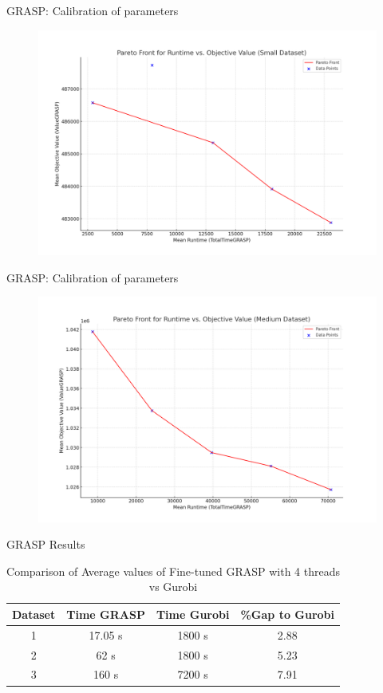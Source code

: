 \documentclass{beamer}
\begin{document}
\begin{frame}{GRASP: Calibration of parameters}
\begin{figure}
        \centering
        \includegraphics[scale=0.3]{pareto_front_small.png}
    \end{figure}
\end{frame}
\begin{frame}{GRASP: Calibration of parameters}
\begin{figure}
        \centering
        \includegraphics[scale=0.3]{pareto_front_medium.png}
    \end{figure}
\end{frame}

\begin{frame}{GRASP Results}
    \begin{table}[h]
    \centering
    \begin{tabular}{|c|c|c|c|}
        \hline
        \textbf{Dataset} & \textbf{Time GRASP} & \textbf{Time Gurobi} & \textbf{\%Gap to Gurobi} \\
        \hline
        1 & 17.05 s & 1800 s & 2.88 \\
        \hline
        2 & 62 s & 1800 s & 5.23 \\
        \hline
        3 & 160 s & 7200 s & 7.91 \\
        \hline
    \end{tabular}
    \caption{Comparison of Average values of Fine-tuned GRASP with 4 threads vs Gurobi}
    \label{tab:comparison}
\end{table}

\end{frame}
\end{document}
